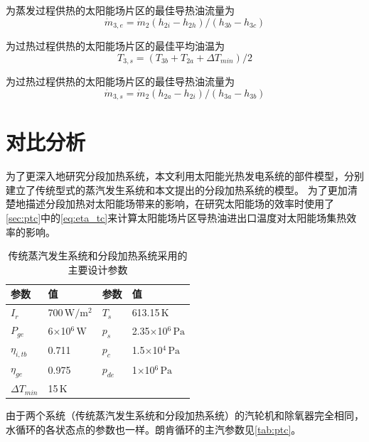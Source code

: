 为蒸发过程供热的太阳能场片区的最佳导热油流量为
\begin{equation}
  \dot{m}_{3,e} = \dot{m}_{2}(h_{2i} - h_{2h})/(h_{3b} - h_{3c})
  \label{eq:m_3e}
\end{equation}

为过热过程供热的太阳能场片区的最佳平均油温为
\begin{equation}
  T_{3,s} = (T_{3b} + T_{2a} + \Delta T_{min})/2
\end{equation}

为过热过程供热的太阳能场片区的最佳导热油流量为
\begin{equation}
  \dot{m}_{3,s} = \dot{m}_{2}(h_{2a} - h_{2i})/(h_{3a} - h_{3b})
\end{equation}

\section{对比分析}

为了更深入地研究分段加热系统，本文利用太阳能光热发电系统的部件模型，分别建立了传统型式的蒸汽发生系统和本文提出的分段加热系统的模型。
为了更加清楚地描述分段加热对太阳能场带来的影响，在研究太阳能场的效率时使用了\autoref{sec:ptc}中的\autoref{eq:eta_tc}来计算太阳能场片区导热油进出口温度对太阳能场集热效率的影响。

\begin{table}[htbp]
\setlength{\abovecaptionskip}{0pt}
	\caption{传统蒸汽发生系统和分段加热系统采用的主要设计参数}
	\centering
	\begin{tabular}{p{1.5cm}<{\centering} p{3.5cm}<{\centering} p{1.5cm}<{\centering} p{3.5cm}<{\centering}}
		\toprule
		参数		&	值	&	参数		&	值\\
		\midrule
		$I_r$	&	700$\,\mathrm{W/m^2}$	&	$T_s$		&	613.15$\,\mathrm{K}$\\
		$P_{ge}$	&	6$\times$10$^6\,\mathrm{W}$	&	$p_s$		&	2.35$\times$10$^6\,\mathrm{Pa}$\\
		$\eta_{i,tb}$	&	0.711	&	$p_c$		&	1.5$\times$10$^4\,\mathrm{Pa}$\\
		$\eta_{ge}$	&	0.975	&	$p_{de}$		&	1$\times$10$^6\,\mathrm{Pa}$\\
		$\Delta T_{min}$	&	15$\,\mathrm{K}$	&	&\\		
		\bottomrule
	\end{tabular}
	\label{tab:ptc}
\end{table}

由于两个系统（传统蒸汽发生系统和分段加热系统）的汽轮机和除氧器完全相同，水循环的各状态点的参数也一样。朗肯循环的主汽参数见\autoref{tab:ptc}。

